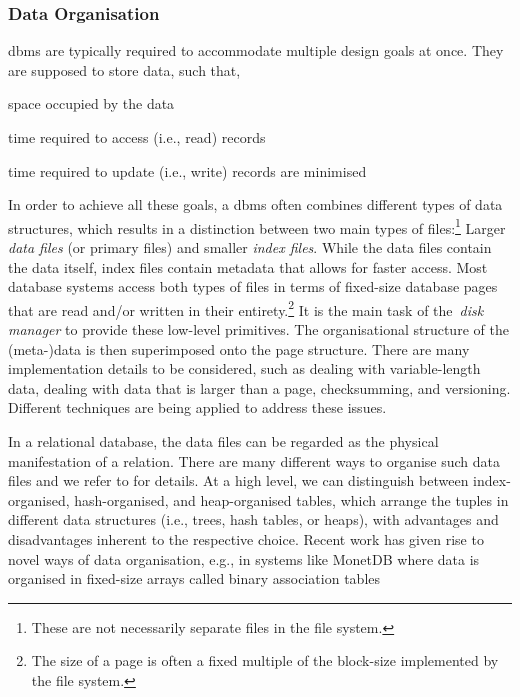 \subsubsection{Data Organisation}
\acrshort{dbms} are typically required to accommodate multiple design goals at once. They are supposed to store data, such that,
\begin{enumerate*}[label=(\roman*),itemjoin={{, }}, itemjoin*={{, and, }}, after={{.}}]
    \item space occupied by the data
    \item time required to access (i.e., read) records
    \item time required to update (i.e., write) records are minimised
\end{enumerate*}
In order to achieve all these goals, a \acrshort{dbms} often combines different types of data structures, which results in a distinction between two main types of files:\footnote{These are not necessarily separate files in the file system.} Larger \emph{data files} (or primary files) and smaller \emph{index files}. While the data files contain the data itself, index files contain metadata that allows for faster access. Most database systems access both types of files in terms of fixed-size database pages that are read and/or written in their entirety.\footnote{The size of a page is often a fixed multiple of the block-size implemented by the file system.} It is the main task of the \emph{disk manager} to provide these low-level primitives. The organisational structure of the (meta-)data is then superimposed onto the page structure. There are many implementation details to be considered, such as dealing with variable-length data, dealing with data that is larger than a page, checksumming, and versioning. Different techniques are being applied to address these issues.

In a relational database, the data files can be regarded as the physical manifestation of a relation. There are many different ways to organise such data files and we refer to \cite{Petrov:2019Database} for details. At a high level, we can distinguish between index-organised, hash-organised, and heap-organised tables, which arrange the tuples in different data structures (i.e., trees, hash tables, or heaps), with advantages and disadvantages inherent to the respective choice. Recent work has given rise to novel ways of data organisation, e.g., in systems like MonetDB where data is organised in fixed-size arrays called binary association tables \cite{Boncz:2008Breaking}

